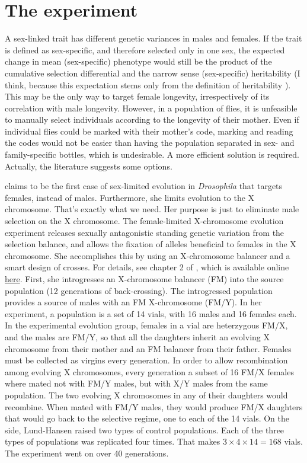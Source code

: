 \documentclass[a4paper,12pt]{article}
\begin{document}
\section{The experiment}
A sex-linked trait has different genetic variances in males and females. If the trait is defined as sex-specific, and therefore selected only in one sex, the expected change in mean (sex-specific) phenotype would still be the product of the cumulative selection differential and the narrow sense (sex-specific) heritability (I think, because this expectation stems only from the definition of heritability \citep[page XX]{Falconer1989}). This may be the only way to target female longevity, irrespectively of its correlation with male longevity. However, in a population of flies, it is unfeasible to manually select individuals according to the longevity of their mother. Even if individual flies could be marked with their mother's code, marking and reading the codes would not be easier than having the population separated in sex- and family-specific bottles, which is undesirable. A more efficient solution is required. Actually, the literature suggests some options.

\citet[p. 19]{Lund-Hansen2017} claims to be the first case of sex-limited evolution in \emph{Drosophila} that targets females, instead of males. Furthermore, she limits evolution to the X chromosome. That's exactly what we need. Her purpose is just to eliminate male selection on the X chromosome. The female-limited X-chromosome evolution experiment releases sexually antagonistic standing genetic variation from the selection balance, and allows the fixation of alleles beneficial to females in the X chromosome. She accomplishes this by using an X-chromosome balancer and a smart design of crosses. For details, see chapter 2 of \citet{Lund-Hansen2017}, which is available online \href{http://sro.sussex.ac.uk/70184/1/Lund-Hansen%2C%20Katrine%20Koch.pdf}{here}.
First, she introgresses an X-chromosome balancer (FM) into the source population (12 generations of back-crossing). The introgressed population provides a source of males with an FM X-chromosome (FM/Y). In her experiment, a population is a set of 14 vials, with 16 males and 16 females each. In the experimental evolution group, females in a vial are heterzygous FM/X, and the males are FM/Y, so that all the daughters inherit an evolving X chromosome from their mother and an FM balancer from their father. Females must be collected as virgins every generation. In order to allow recombination among evolving X chromosomes, every generation a subset of 16 FM/X females where mated not with FM/Y males, but with X/Y males from the same population. The two evolving X chromosomes in any of their daughters would recombine. When mated with FM/Y males, they would produce FM/X daughters that would go back to the selective regime, one to each of the 14 vials. On the side, Lund-Hansen raised two types of control populations. Each of the three types of populations was replicated four times. That makes $3\times 4 \times 14 = 168$ vials. The experiment went on over 40 generations.
\end{document}
